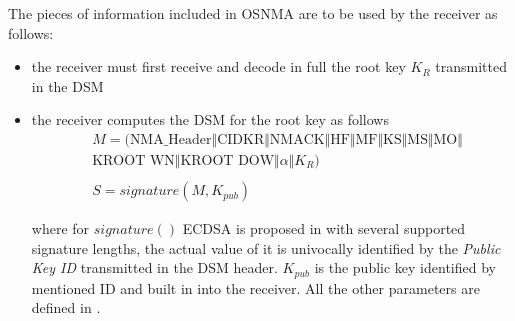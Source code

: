 The pieces of information included in OSNMA are to be used by the receiver as
follows:
\begin{itemize}
\item the receiver must first receive and decode in full the root key $K_R$
transmitted in the DSM
\item the receiver computes the DSM for the root key as follows
\begin{align*}
& M = (\text{NMA\_Header} \Vert \text{CIDKR} \Vert \text{NMACK} \Vert \text{HF}
\Vert \text{MF} \Vert \text{KS} \Vert \text{MS} \Vert \text{MO} \Vert \\
& \text{KROOT WN} \Vert \text{KROOT DOW} \Vert \alpha \Vert K_R) \\
\\
& S = signature(M, K_{pub})
\end{align*}

where for $signature()$ ECDSA is proposed in \cite{osnma} with several supported
signature lengths, the actual value of it is univocally identified by the
\textit{Public Key ID} transmitted in the DSM header. $K_{pub}$ is the public
key identified by mentioned ID and built in into the receiver. All the other
parameters are defined in \cite{osnma}.


\end{itemize}

